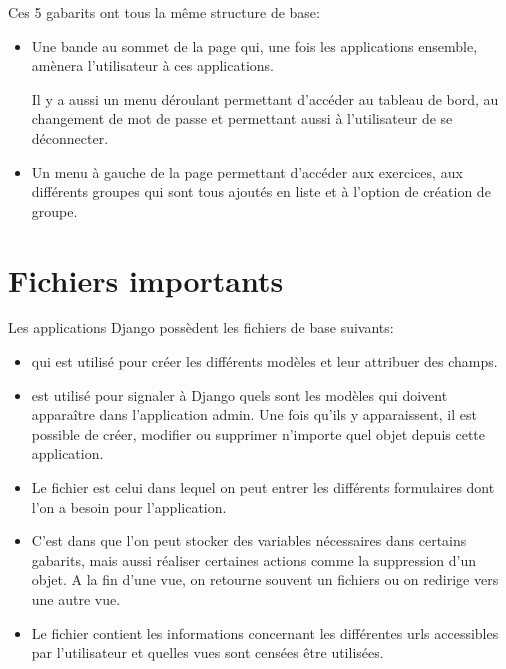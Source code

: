 \documentclass[a4paper,10pt,french]{sphinxmanual}
\begin{document}
Ces 5 gabarits ont tous la même structure de base:
\begin{itemize}
\item {} 
Une bande au sommet de la page qui, une fois les applications ensemble,
amènera l'utilisateur à ces applications.

Il y a aussi un menu déroulant permettant d'accéder au tableau de bord,
au changement de mot de passe et permettant aussi à l'utilisateur de se
déconnecter.

\item {} 
Un menu à gauche de la page permettant d'accéder aux exercices, aux
différents groupes qui sont tous ajoutés en liste et à l'option de création
de groupe.

\end{itemize}


\section{Fichiers importants}
\label{documentation:fichiers-importants}
Les applications Django possèdent les fichiers de base suivants:
\begin{itemize}
\item {} 
 qui est utilisé pour créer les différents modèles et leur
attribuer des champs.

\item {} 
 est utilisé pour signaler à Django quels sont les modèles qui
doivent apparaître dans l'application admin. Une fois qu'ils y apparaissent,
il est possible de créer, modifier ou supprimer n'importe quel objet depuis
cette application.

\item {} 
Le fichier  est celui dans lequel on peut entrer les différents
formulaires dont l'on a besoin pour l'application.

\item {} 
C'est dans  que l'on peut stocker des variables nécessaires
dans certains gabarits, mais aussi réaliser certaines actions comme la
suppression d'un objet. A la fin d'une vue, on retourne souvent un fichiers
 ou on redirige vers une autre vue.

\item {} 
Le fichier  contient les informations concernant les différentes
urls accessibles par l'utilisateur et quelles vues sont censées être
utilisées.

\end{itemize}
\end{document}

